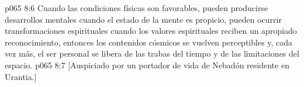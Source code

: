 \vs p065 8:6 Cuando las condiciones físicas son favorables, pueden producirse desarrollos mentales  cuando el estado de la mente es propicio, pueden ocurrir transformaciones espirituales  cuando los valores espirituales reciben un apropiado reconocimiento, entonces los contenidos cósmicos se vuelven perceptibles y, cada vez más, el ser personal se libera de las trabas del tiempo y de las limitaciones del espacio.
\vsetoff
\vs p065 8:7 [Auspiciado por un portador de vida de Nebadón residente en Urantia.]
